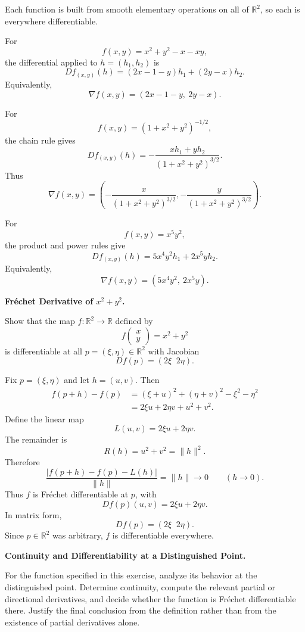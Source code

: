 \begin{solution}
Each function is built from smooth elementary operations on all of \(\mathbb R^2\), so each
is everywhere differentiable.

For
\[
f(x,y)=x^2+y^2-x-xy,
\]
the differential applied to \(h=(h_1,h_2)\) is
\[
\boxed{
Df_{(x,y)}(h)
=
(2x-1-y)h_1+(2y-x)h_2.
}
\]
Equivalently,
\[
\nabla f(x,y)
=
(2x-1-y,\ 2y-x).
\]

For
\[
f(x,y)=(1+x^2+y^2)^{-1/2},
\]
the chain rule gives
\[
\boxed{
Df_{(x,y)}(h)
=
-\frac{x h_1+y h_2}
{(1+x^2+y^2)^{3/2}}.
}
\]
Thus
\[
\nabla f(x,y)
=
\left(
-\frac{x}{(1+x^2+y^2)^{3/2}},
-\frac{y}{(1+x^2+y^2)^{3/2}}
\right).
\]

For
\[
f(x,y)=x^5y^2,
\]
the product and power rules give
\[
\boxed{
Df_{(x,y)}(h)
=
5x^4y^2h_1+2x^5yh_2.
}
\]
Equivalently,
\[
\nabla f(x,y)
=
(5x^4y^2,\ 2x^5y).
\]
\end{solution}


\begin{problem}[CP-II-0328]
\label{prob:cp-ii-0328}
\textbf{Fréchet Derivative of \(x^2+y^2\).}

\hspace*{1.5em}Show that the map $f:\mathbb{R}^2\to\mathbb{R}$ defined by
\[
f\!\begin{pmatrix}x\\y\end{pmatrix}=x^2+y^2
\]
is differentiable at all $p=(\xi,\eta)\in\mathbb{R}^2$ with Jacobian
\[
Df(p)=(2\xi\;\;2\eta).
\]
\end{problem}

\begin{solution}
Fix \(p=(\xi,\eta)\) and let \(h=(u,v)\). Then
\[
\begin{aligned}
f(p+h)-f(p)
&=(\xi+u)^2+(\eta+v)^2-\xi^2-\eta^2\\
&=2\xi u+2\eta v+u^2+v^2.
\end{aligned}
\]
Define the linear map
\[
L(u,v)=2\xi u+2\eta v.
\]
The remainder is
\[
R(h)=u^2+v^2=\|h\|^2.
\]
Therefore
\[
\frac{|f(p+h)-f(p)-L(h)|}{\|h\|}
=
\|h\|
\longrightarrow0
\qquad(h\to0).
\]
Thus \(f\) is Fréchet differentiable at \(p\), with
\[
Df(p)(u,v)=2\xi u+2\eta v.
\]
In matrix form,
\[
\boxed{Df(p)=(2\xi\;\;2\eta).}
\]
Since \(p\in\mathbb R^2\) was arbitrary, \(f\) is differentiable everywhere.
\end{solution}

\begin{problem}[CP-II-0354]
\label{prob:cp-ii-0354}
\textbf{Continuity and Differentiability at a Distinguished Point.}

\hspace*{1.5em}For the function specified in this exercise, analyze its behavior at the
distinguished point. Determine continuity, compute the relevant partial or
directional derivatives, and decide whether the function is Fréchet
differentiable there. Justify the final conclusion from the definition rather
than from the existence of partial derivatives alone.
\end{problem}

